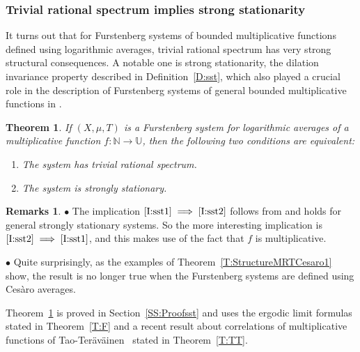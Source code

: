 \documentclass[11pt]{amsart}
\newtheorem{theorem}[lemma]{Theorem}
\theoremstyle{definition}
\newtheorem*{remarks}{Remarks}
\newcommand{\N}{{\mathbb N}}
\newcommand{\U}{{\mathbb U}}
\begin{document}
 \subsubsection{Trivial rational spectrum implies strong stationarity}
It turns out that  for Furstenberg systems of bounded multiplicative functions defined using  logarithmic averages, trivial rational spectrum has very strong structural consequences. A notable one is strong stationarity,  the dilation invariance property described in  Definition~\ref{D:sst}, which  also played a crucial role in the description of Furstenberg systems of general bounded multiplicative functions in \cite{FH18}.
 \begin{theorem}\label{T:sst}
 	If  $(X,\mu,T)$ is a  Furstenberg system  for logarithmic averages	of  a multiplicative function  $f\colon \N\to \U$,  then the following two conditions are equivalent:
 	\begin{enumerate}
 		\item \label{I:sst2} The system has trivial rational spectrum.
 		
 		\smallskip
 		
 		\item \label{I:sst1} The system is strongly stationary. 	
 	\end{enumerate}
 \end{theorem}
\begin{remarks}
$\bullet$ 	The implication $\eqref{I:sst1}\implies \eqref{I:sst2}$ follows from \cite{Jen97} and holds for  general strongly stationary systems. So the more interesting implication is  $\eqref{I:sst2}\implies \eqref{I:sst1}$, and this makes use of the fact that $f$ is multiplicative.

$\bullet$ Quite surprisingly, as the examples of Theorem~\ref{T:StructureMRTCesaro1} show, the result is no longer true when the Furstenberg systems  are defined using Ces\`aro averages.
\end{remarks}
Theorem~\ref{T:sst} is proved in Section~\ref{SS:Proofsst} and uses
the  ergodic limit formulas stated in Theorem~\ref{T:F} and a recent result about correlations of multiplicative functions  of Tao-Ter\"av\"ainen~\cite{TT18} stated in Theorem~\ref{T:TT}.
\end{document}
